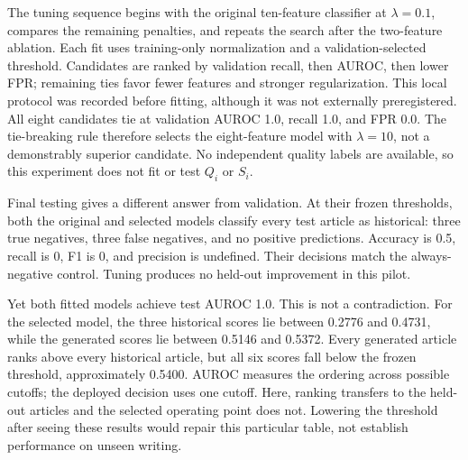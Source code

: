 \documentclass[11pt]{article}
\begin{document}
The tuning sequence begins with the original ten-feature classifier at
$\lambda=0.1$, compares the remaining penalties, and repeats the search after
the two-feature ablation. Each fit uses training-only normalization and a
validation-selected threshold. Candidates are ranked by validation recall,
then AUROC, then lower FPR; remaining ties favor fewer features and stronger
regularization. This local protocol was recorded before fitting, although
it was not externally preregistered. All eight candidates tie at validation
AUROC 1.0, recall 1.0, and FPR 0.0. The tie-breaking rule therefore selects
the eight-feature model with $\lambda=10$, not a demonstrably superior
candidate. No independent quality labels are available, so this experiment
does not fit or test $Q_i$ or $S_i$.



Final testing gives a different answer from validation. At their frozen
thresholds, both the original and selected models classify every test article
as historical: three true negatives, three false negatives, and no positive
predictions. Accuracy is 0.5, recall is 0, F1 is 0, and precision is undefined.
Their decisions match the always-negative control. Tuning produces no
held-out improvement in this pilot.

Yet both fitted models achieve test AUROC 1.0. This is not a contradiction.
For the selected model, the three historical scores lie between 0.2776 and
0.4731, while the generated scores lie between 0.5146 and 0.5372. Every
generated article ranks above every historical article, but all six scores
fall below the frozen threshold, approximately 0.5400. AUROC measures the
ordering across possible cutoffs; the deployed decision uses one cutoff.
Here, ranking transfers to the held-out articles and the selected operating
point does not. Lowering the threshold after seeing these results would
repair this particular table, not establish performance on unseen writing.
\end{document}
